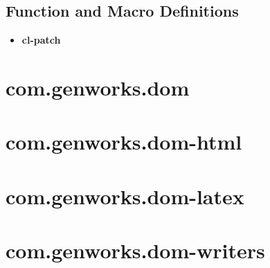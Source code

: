\documentclass [11pt]{book}
\begin{document}
\subsection{Function and Macro Definitions}

\label{subsec:functionandmacrodefinitions}



\begin{itemize}

\item {}
\label{prim:cl-patch}
\textbf{cl-patch}





\end{itemize}





\section{com.genworks.dom }

\label{sec:com.genworks.dom}







\section{com.genworks.dom-html }

\label{sec:com.genworks.dom-html}







\section{com.genworks.dom-latex }

\label{sec:com.genworks.dom-latex}







\section{com.genworks.dom-writers }

\label{sec:com.genworks.dom-writers}
\end{document}
